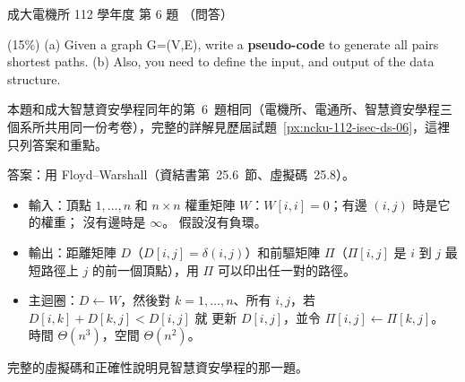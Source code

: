 \begin{pastexam}[label={px:ncku-112-ee-ds-06}]{成大電機所 112 學年度 第 6 題}
（問答）

(15\%) (a) Given a graph G=(V,E), write a \textbf{pseudo-code} to generate all pairs shortest
paths. (b) Also, you need to define the input, and output of the data structure.
\end{pastexam}

\begin{pastsoln}
本題和成大智慧資安學程同年的第~6~題相同（電機所、電通所、智慧資安學程三個系所共用同一份考卷），完整的詳解見歷屆試題~\ref{px:ncku-112-isec-ds-06}，這裡只列答案和重點。

答案：用 Floyd--Warshall（資結書第~25.6~節、虛擬碼~25.8）。
\begin{itemize}
\item 輸入：頂點 $1, \ldots, n$ 和 $n \times n$ 權重矩陣 $W$：$W[i, i] = 0$；有邊 $(i, j)$ 時是它的權重；
沒有邊時是 $\infty$。 假設沒有負環。
\item 輸出：距離矩陣 $D$（$D[i, j] = \delta(i, j)$）和前驅矩陣 $\Pi$（$\Pi[i, j]$ 是 $i$ 到 $j$ 最短路徑上
$j$ 的前一個頂點），用 $\Pi$ 可以印出任一對的路徑。
\item 主迴圈：$D \gets W$，然後對 $k = 1, \ldots, n$、所有 $i, j$，若 $D[i, k] + D[k, j] < D[i, j]$ 就
更新 $D[i, j]$，並令 $\Pi[i, j] \gets \Pi[k, j]$。 時間 $\Theta(n^{3})$，空間 $\Theta(n^{2})$。
\end{itemize}
完整的虛擬碼和正確性說明見智慧資安學程的那一題。
\end{pastsoln}
